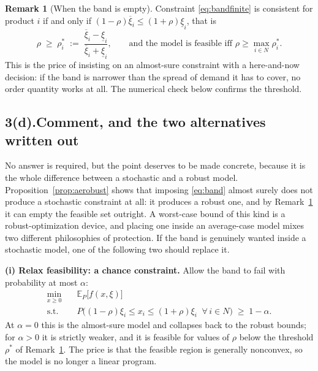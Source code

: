 \documentclass[11pt]{article}
\DeclareMathOperator*{\minimize}{min}
\theoremstyle{definition}
\newtheorem{remark}{Remark}
\begin{document}
\begin{remark}[When the band is empty]
\label{rem:feas}
Constraint \eqref{eq:bandfinite} is consistent for product $i$ if and only
if $(1-\rho)\overline{\xi}_i \le (1+\rho)\underline{\xi}_i$, that is
\begin{equation}
  \rho \;\ge\; \rho^{*}_i \;:=\;
  \frac{\overline{\xi}_i - \underline{\xi}_i}
       {\overline{\xi}_i + \underline{\xi}_i},
  \qquad\text{and the model is feasible iff }
  \rho \ge \max_{i \in N} \rho^{*}_i .
\end{equation}
This is the price of insisting on an almost-sure constraint with a
here-and-now decision: if the band is narrower than the spread of demand
it has to cover, no order quantity works at all. The numerical check
below confirms the threshold.
\end{remark}

\subsection*{3(d).\quad Comment, and the two alternatives written out}

No answer is required, but the point deserves to be made concrete, because
it is the whole difference between a stochastic and a robust model.
Proposition~\ref{prop:aerobust} shows that imposing \eqref{eq:band}
almost surely does not produce a stochastic constraint at all: it produces
a robust one, and by Remark~\ref{rem:feas} it can empty the feasible set
outright. A worst-case bound of this kind is a robust-optimization device,
and placing one inside an average-case model mixes two different
philosophies of protection. If the band is genuinely wanted inside a
stochastic model, one of the following two should replace it.

\textbf{(i) Relax feasibility: a chance constraint.} Allow the band to
fail with probability at most $\alpha$:
\begin{align}
  \minimize_{x \ge 0} \quad & \mathbb{E}_P\big[ f(x,\xi) \big] \\
  \text{s.t.}\quad
    & P\Big( (1-\rho)\xi_i \le x_i \le (1+\rho)\xi_i \;\;
      \forall\, i \in N \Big) \;\ge\; 1-\alpha .
\end{align}
At $\alpha = 0$ this is the almost-sure model and collapses back to the
robust bounds; for $\alpha > 0$ it is strictly weaker, and it is feasible
for values of $\rho$ below the threshold $\rho^{*}$ of
Remark~\ref{rem:feas}. The price is that the feasible region is generally
nonconvex, so the model is no longer a linear program.
\end{document}
